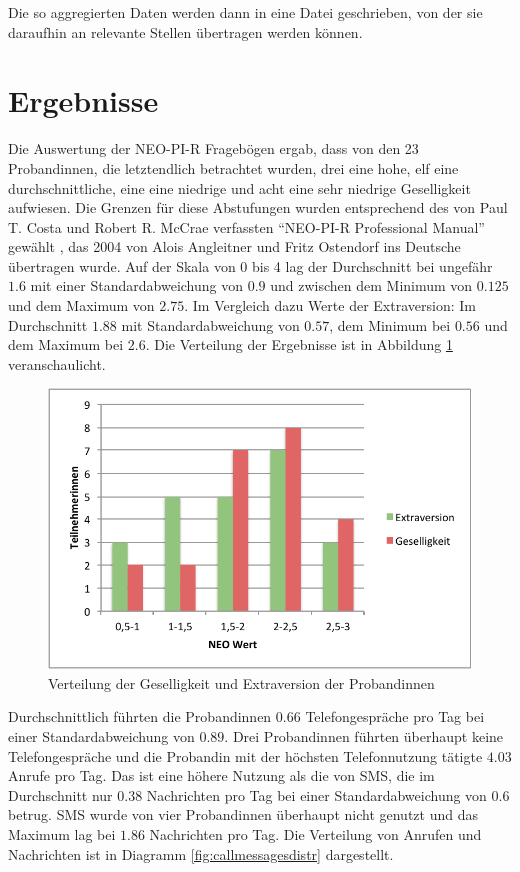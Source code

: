 Die so aggregierten Daten werden dann in eine Datei geschrieben, von der sie daraufhin an relevante Stellen übertragen werden können.

\section{Ergebnisse}

Die Auswertung der NEO-PI-R Fragebögen ergab, dass von den 23 Probandinnen, die letztendlich betrachtet wurden, drei eine hohe, elf eine durchschnittliche, eine eine niedrige und acht eine sehr niedrige Geselligkeit aufwiesen.
Die Grenzen für diese Abstufungen wurden entsprechend des von Paul T. Costa und Robert R. McCrae verfassten "`NEO-PI-R Professional Manual"' gewählt \cite{costa1992neo}, das 2004 von Alois Angleitner und Fritz Ostendorf ins Deutsche übertragen wurde\cite{lin1973}.
Auf der Skala von 0 bis 4 lag der Durchschnitt bei ungefähr $1.6$ mit einer Standardabweichung von $0.9$ und zwischen dem Minimum von $0.125$ 
und dem Maximum von $2.75$.
Im Vergleich dazu Werte der Extraversion:
Im Durchschnitt $1.88$ mit Standardabweichung von $0.57$, dem Minimum bei $0.56$ und dem Maximum bei $2.6$.
Die Verteilung der Ergebnisse ist in Abbildung \ref{fig:neoergebnisse} veranschaulicht.

\begin{figure}[h]
    \centering
    \includegraphics{images/NeoErgebnisse.pdf}
    \caption{Verteilung der Geselligkeit und Extraversion der Probandinnen}
    \label{fig:neoergebnisse}
\end{figure}

Durchschnittlich führten die Probandinnen $0.66$ Telefongespräche pro Tag bei einer Standardabweichung von $0.89$.
Drei Probandinnen führten überhaupt keine Telefongespräche und die Probandin mit der höchsten Telefonnutzung tätigte $4.03$ Anrufe pro Tag.
Das ist eine höhere Nutzung als die von SMS, die im Durchschnitt nur $0.38$ Nachrichten pro Tag bei einer Standardabweichung von $0.6$ betrug.
SMS wurde von vier Probandinnen überhaupt nicht genutzt und das Maximum lag bei $1.86$ Nachrichten pro Tag.
Die Verteilung von Anrufen und Nachrichten ist in Diagramm \ref{fig:callmessagesdistr} dargestellt.

